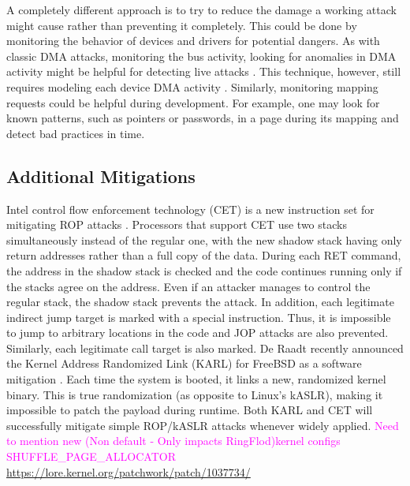 A completely different approach is to try to reduce the damage a working attack might cause rather than preventing it completely. This could be done by monitoring the behavior of devices and drivers for potential dangers. As with classic DMA attacks, monitoring the bus activity, looking for anomalies in DMA activity might be helpful for detecting live attacks \cite{Ste13}. This technique, however, still requires modeling each device DMA activity \cite{Ste14}. Similarly, monitoring mapping requests could be helpful during development. For example, one may look for known patterns, such as pointers or passwords, in a page during its mapping and detect bad practices in time.

\subsection{Additional Mitigations}
Intel control flow enforcement technology (CET) is a new instruction set for mitigating ROP attacks \cite{Int17}. Processors that support CET use two stacks simultaneously instead of the regular one, with the new shadow stack having only return addresses rather than a full copy of the data. During each RET command, the address in the shadow stack is checked and the code continues running only if the stacks agree on the address. Even if an attacker manages to control the regular stack, the shadow stack prevents the attack. In addition, each legitimate indirect jump target is marked with a special instruction. Thus, it is impossible to jump to arbitrary locations in the code and JOP attacks are also prevented. Similarly, each legitimate call target is also marked. De Raadt recently announced the Kernel Address Randomized Link (KARL) for FreeBSD as a software mitigation \cite{dr17}. Each time the system is booted, it links a new, randomized kernel binary. This is true randomization (as opposite to Linux’s kASLR), making it impossible to patch the payload during runtime. Both KARL and CET will successfully mitigate simple ROP/kASLR attacks whenever widely applied. 
\textcolor{magenta}{Need to mention new (Non default - Only impacts RingFlod)kernel configs SHUFFLE\_PAGE\_ALLOCATOR \url{https://lore.kernel.org/patchwork/patch/1037734/}}
